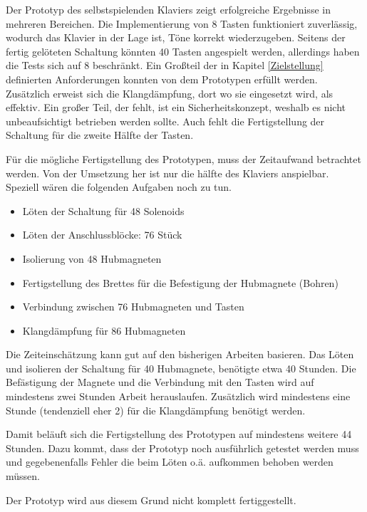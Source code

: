 Der Prototyp des selbstspielenden Klaviers zeigt erfolgreiche Ergebnisse in mehreren Bereichen. Die Implementierung von
8 Tasten funktioniert zuverlässig, wodurch das Klavier in der Lage ist, Töne korrekt wiederzugeben. Seitens der
fertig gelöteten Schaltung könnten 40 Tasten angespielt werden, allerdings haben die Tests sich auf 8 beschränkt.
Ein Großteil der in Kapitel \ref{Zielstellung} definierten Anforderungen konnten von dem Prototypen erfüllt werden.
Zusätzlich erweist sich die Klangdämpfung, dort wo sie eingesetzt wird, als effektiv. \newline
Ein großer Teil, der fehlt, ist ein Sicherheitskonzept, weshalb es nicht unbeaufsichtigt betrieben
werden sollte.
Auch fehlt die Fertigstellung der Schaltung für die zweite Hälfte der Tasten.

Für die mögliche Fertigstellung des Prototypen, muss der Zeitaufwand betrachtet werden.
Von der Umsetzung her ist nur die hälfte des Klaviers anspielbar. Speziell wären die folgenden Aufgaben noch zu tun.
\begin{itemize}
    \item Löten der Schaltung für 48 Solenoids
    \item Löten der Anschlussblöcke: 76 Stück
    \item Isolierung von 48 Hubmagneten
    \item Fertigstellung des Brettes für die Befestigung der Hubmagnete (Bohren)
    \item Verbindung zwischen 76 Hubmagneten und Tasten
    \item Klangdämpfung für 86 Hubmagneten
\end{itemize}

Die Zeiteinschätzung kann gut auf den bisherigen Arbeiten basieren. Das Löten und isolieren der Schaltung für
40 Hubmagnete, benötigte etwa 40 Stunden. Die Befästigung der Magnete und die Verbindung mit den Tasten wird auf
mindestens zwei Stunden Arbeit herauslaufen.
Zusätzlich wird mindestens eine Stunde (tendenziell eher 2) für die Klangdämpfung benötigt werden.

Damit beläuft sich die Fertigstellung des Prototypen auf mindestens weitere 44 Stunden. Dazu kommt, dass der Prototyp
noch ausführlich getestet werden muss und gegebenenfalls Fehler die beim Löten o.ä. aufkommen behoben werden müssen.

Der Prototyp wird aus diesem Grund nicht komplett fertiggestellt.

